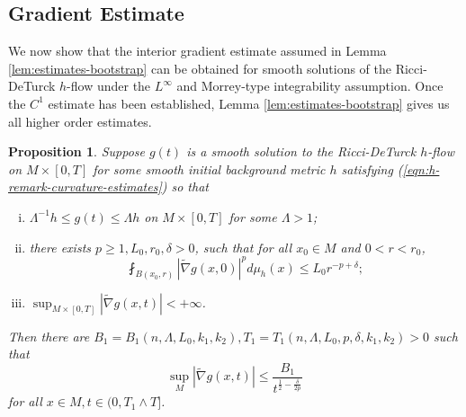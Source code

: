 \documentclass[12pt]{amsart}
\newcommand{\hdel}{\tilde{\nabla}}
\newtheorem{prop}[thm]{Proposition}
\theoremstyle{remark}
\numberwithin{equation}{section}
\begin{document}
\subsection{Gradient Estimate}

We now show that the interior gradient estimate assumed in Lemma \ref{lem:estimates-bootstrap} can be obtained for smooth solutions of the Ricci-DeTurck $h$-flow under the $L^\infty$ and Morrey-type integrability assumption. Once the $C^1$ estimate has been established, Lemma \ref{lem:estimates-bootstrap} gives us all higher order estimates.

\begin{prop}\label{prop:gradient-estimate}
    Suppose $g(t)$ is a smooth solution to the Ricci-DeTurck $h$-flow on $M \times [0,T]$ for some smooth initial background metric $h$ satisfying (\ref{eqn:h-remark-curvature-estimates}) so that
    \begin{enumerate}[(i)]
        \item $\Lambda^{-1}h \leq g(t) \leq \Lambda h$ on $M\times[0,T]$ for some $\Lambda > 1$;
        \item there exists $p \geq 1, L_0, r_0 ,\delta > 0$,  such that for all $x_0 \in M$ and $0 < r < r_0$,
        \begin{equation*}
            \fint_{B(x_0,r)} |\hdel g(x,0)|^p d\mu_h(x) \leq L_0r^{-p+\delta};
        \end{equation*}
        \item $\sup_{M\times [0,T]} |\tilde\nabla g(x,t)|<+\infty$.
    \end{enumerate}
    Then there are $B_1 = B_1(n,\Lambda,L_0,k_1,k_2), T_1 = T_1(n,\Lambda,L_0,p,\delta,k_1,k_2) > 0$ such that
    \begin{equation}\label{eqn:interior-gradient-estimate}
        \sup\limits_M|\hdel g(x,t)| \leq \frac{B_1}{t^{\frac{1}{2}-\frac{\delta}{2p}}}
    \end{equation}
    for all $x \in M, t \in (0, T_1\wedge T]$.
\end{prop}
\end{document}
